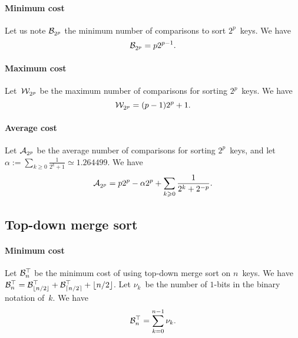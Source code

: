 \paragraph{Minimum cost}

Let us note \(\mathcal{B}_{2^p}^{}\) the minimum number of comparisons to sort
\(2^p\)~keys. We have
\begin{equation*}
\mathcal{B}_{2^p}^{} = p2^{p-1}.
\end{equation*}

\paragraph{Maximum cost}

Let~\(\mathcal{W}_{2^p}^{}\) be the maximum number of comparisons for sorting
\(2^p\)~keys. We have
\begin{equation*}
\mathcal{W}_{2^p}^{} = (p-1)2^p + 1.
\end{equation*}

\paragraph{Average cost}

Let \(\mathcal{A}_{2^p}^{}\) be the average number of comparisons for sorting
\(2^p\)~keys, and let \(\alpha := \sum_{k \geqslant 0}\frac{1}{2^k+1}
\simeq 1.264499\). We have
\begin{equation*}
\mathcal{A}_{2^p}^{}
  = p2^p - \alpha 2^p + \sum_{k \geqslant 0}\frac{1}{2^{k}+2^{-p}}.
\end{equation*}


\subsection{Top-down merge sort}


\paragraph{Minimum cost}

Let \(\mathcal{B}_{n}^{\top}\) be the minimum cost of using top-down merge
sort on \(n\)~keys. We have \(\mathcal{B}_{n}^{\top} = \mathcal{B}_{\lfloor{n/2}\rfloor}^{\top} +
\mathcal{B}_{\lceil{n/2}\rceil}^{\top} + \lfloor{n/2}\rfloor\). Let \(\nu_k\)~be the number
of \(1\)-bits in the binary notation of~\(k\). We have
\begin{equation}
\mathcal{B}_{n}^{\top} = \sum_{k=0}^{n-1}{\nu_k}.
\label{eq:Btop}
\end{equation}

